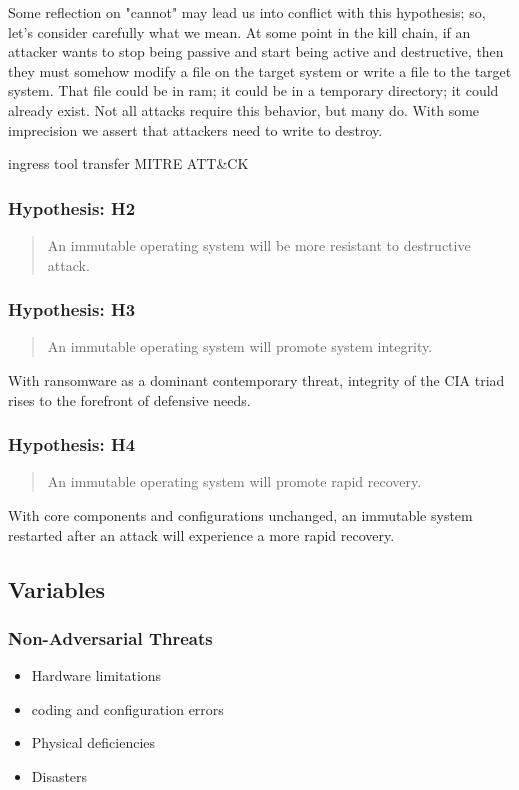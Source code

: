 Some reflection on "cannot" may lead us into conflict with this \gls{hypothesis}; so, let's consider carefully what we mean.  At some point in the kill chain, if an attacker wants to stop being passive and start being active and destructive, then they must somehow modify a file on the target system or write a file to the target system.  That file could be in \gls{ram}; it could be in a temporary directory; it could already exist.  Not all attacks require this behavior, but many do.  With some imprecision we assert that attackers need to write to destroy.

ingress tool transfer  MITRE ATT\&CK
\subsubsection{Hypothesis:  H2}
\begin{quotation}\raggedright An immutable \gls{operating system} will be more resistant to destructive \gls{attack}.\end{quotation}

\subsubsection{Hypothesis:  H3}
\begin{quotation}\raggedright An immutable \gls{operating system} will promote system \gls{integrity}.\end{quotation}

With \gls{ransomware} as a dominant contemporary \gls{threat}, \gls{integrity} of the CIA triad rises to the forefront of defensive needs.
\subsubsection{Hypothesis:  H4}
\begin{quotation}\raggedright An immutable \gls{operating system} will promote rapid recovery.\end{quotation}

With core components and configurations unchanged, an \gls{immutable system} restarted after an \gls{attack} will experience a more rapid recovery.
\subsection{Variables}

\subsubsection{Non-Adversarial Threats}
\begin{itemize}
	\item Hardware limitations
	\item \gls{coding} and \gls{configuration} errors
	\item Physical deficiencies
	\item Disasters
\end{itemize}

